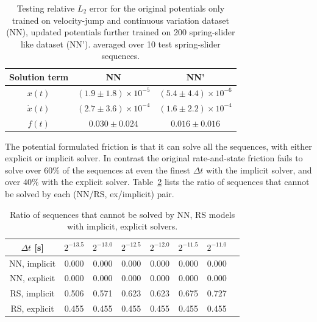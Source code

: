\begin{table}[htbp]
    \centering
    \begin{tabular}{ccc}
        \hline
        Solution term & NN & NN' \\
        \hline
        $x(t)$ & $(1.9 \pm 1.8)\times 10^{-5}$ & $(5.4 \pm 4.4 )\times 10^{-6}$\\
        $\dot{x}(t)$ & $(2.7 \pm 3.6)\times 10^{-4}$ & $(1.6 \pm 2.2)\times 10^{-4}$\\
        $f(t)$ & $0.030 \pm 0.024$ & $0.016 \pm 0.016$\\
        \hline
    \end{tabular}
    \caption{Testing relative $L_2$ error for the original potentials only trained on velocity-jump and continuous variation dataset (NN), 
    updated potentials further trained on 200 spring-slider like dataset (NN'). 
    averaged over 10 test spring-slider sequences. }
    \label{tab:NNvsNNPrime}
\end{table}

The potential formulated friction is that it can solve all the sequences, 
with either explicit or implicit solver.  
In contrast the original rate-and-state friction fails to solve over $60\%$ of the sequences at even the finest $\Delta t$ with the implicit solver, 
and over $40\%$ with the explicit solver. 
Table~\ref{tab:NaNRatioSpringSliderRsVsNNRespective} lists the ratio of sequences that cannot be solved by each (NN/RS, ex/implicit) pair. 

\begin{table}[H]
    \centering
    \begin{tabular}{cccccccc}
        \hline
        $\Delta t$ [s] & $2^{-13.5}$ & $2^{-13.0}$ & $2^{-12.5}$ & $2^{-12.0}$ & $2^{-11.5}$ & $2^{-11.0}$ \\
        \hline
        NN, implicit & 0.000 & 0.000 & 0.000 & 0.000 & 0.000 & 0.000 \\
        NN, explicit & 0.000 & 0.000 & 0.000 & 0.000 & 0.000 & 0.000 \\
        RS, implicit & 0.506 & 0.571 & 0.623 & 0.623 & 0.675 & 0.727 \\
        RS, explicit & 0.455 & 0.455 & 0.455 & 0.455 & 0.455 & 0.455 \\
        \hline
    \end{tabular}
    \caption{Ratio of sequences that cannot be solved by NN, RS models with implicit, explicit solvers.}
    \label{tab:NaNRatioSpringSliderRsVsNNRespective}
\end{table}


